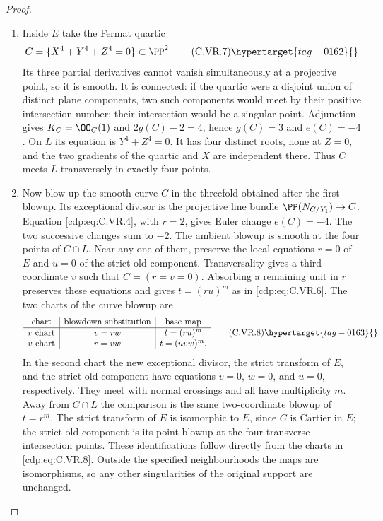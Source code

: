 \begin{proof}
\begin{enumerate}[label=\arabic*.,leftmargin=*]
\item Inside $E$ take the Fermat quartic
\[
 C=\{X^4+Y^4+Z^4=0\}\subset\PP^2.                \tag{C.VR.7}\hypertarget{tag-0162}{}\label{cdp:eq:C.VR.7}
\]
Its three partial derivatives cannot vanish simultaneously at a
projective point, so it is smooth. It is connected: if the quartic
were a disjoint union of distinct plane components, two such
components would meet by their positive intersection number; their
intersection would be a singular point. Adjunction gives
$K_C=\OO_C(1)$ and $2g(C)-2=4$, hence $g(C)=3$ and $e(C)=-4$.
On $L$ its equation is $Y^4+Z^4=0$. It has four distinct roots,
none at $Z=0$, and the two gradients of the quartic and $X$ are
independent there. Thus $C$ meets $L$ transversely in exactly four
points.

\item Now blow up the smooth curve $C$ in the threefold obtained after the
first blowup. Its exceptional divisor is the projective line bundle
$\PP(N_{C/Y_1})\to C$. Equation \eqref{cdp:eq:C.VR.4}, with $r=2$, gives Euler
change $e(C)=-4$. The two successive changes sum to $-2$.
The ambient blowup is smooth at the four points of $C\cap L$. Near any
one of them, preserve the local equations $r=0$ of $E$ and $u=0$ of
the strict old component. Transversality gives a third coordinate $v$
such that $C=(r=v=0)$. Absorbing a remaining unit in $r$ preserves
these equations and gives $t=(ru)^m$ as in \eqref{cdp:eq:C.VR.6}. The two charts of
the curve blowup are
\[
 \begin{array}{c|c|c}
 \text{chart}&\text{blowdown substitution}&\text{base map}\\ \hline
 \text{$r$ chart}&v=rw&t=(ru)^m\\
 \text{$v$ chart}&r=vw&t=(uvw)^m .
 \end{array}                                      \tag{C.VR.8}\hypertarget{tag-0163}{}\label{cdp:eq:C.VR.8}
\]
In the second chart the new exceptional divisor, the strict transform
of $E$, and the strict old component have equations $v=0$, $w=0$,
and $u=0$, respectively. They meet with normal crossings and all
have multiplicity $m$. Away from $C\cap L$ the comparison is the
same two-coordinate blowup of $t=r^m$. The strict transform of $E$
is isomorphic to $E$, since $C$ is Cartier in $E$; the strict old
component is its point blowup at the four transverse intersection
points. These identifications follow directly from the charts in
\eqref{cdp:eq:C.VR.8}. Outside the specified neighbourhoods the maps are
isomorphisms, so any other singularities of the original support
are unchanged.


\end{enumerate}
\end{proof}
